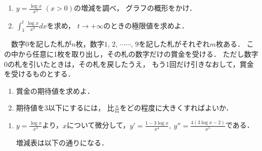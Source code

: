 \begin{problem}
  \begin{enumerate}
\item $\displaystyle y=\frac{\log x}{x^3}$ $(x>0)$の増減を調べ，
グラフの概形をかけ．
\item $\displaystyle\int_1^t\frac{\log x}{x^3}dx$を求め，
$t\to+\infty$のときの極限値を求めよ．
\end{enumerate}

　数字0を記した札が$n$枚，数字$1, \, 2, \, \cdots\cdots, \, 9$を記した札がそれぞれ$m$枚ある．
この中から任意に1枚を取り出し，その札の数字だけの賞金を受ける．
ただし数字0の札を引いたときは，その札を戻したうえ，
もう1回だけ引きなおして，賞金を受けるものとする．
\begin{enumerate}
\item 賞金の期待値を求めよ．
\item 期待値を3以下にするには，
比$\displaystyle\frac{n}{m}$をどの程度に大きくすればよいか．
\end{enumerate}
\end{problem}

\begin{enumerate}
  \item $y = \frac{\log x}{x^3}$より，$x$について微分して，$y' = \frac{1-3\log x}{x^4},\ y'' = \frac{4(3\log x - 2)}{x^5}$である．

  増減表は以下の通りになる．
  

\end{enumerate}

